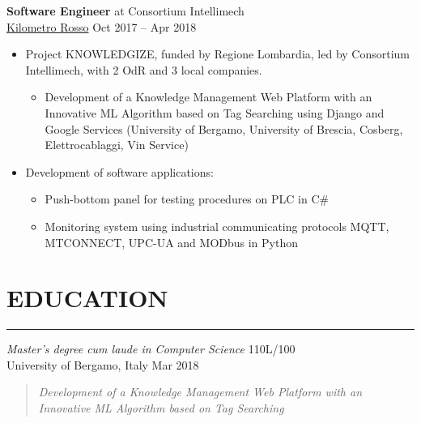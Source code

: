\documentclass[10pt]{article}
\newcommand{\cvsection}[1]{\section*{\centering\normalsize\uppercase{#1}}\vspace{-16pt}\rule{\linewidth}{0.2pt}}
\begin{document}
\vspace{6pt} %

\textbf{Software Engineer} at Consortium Intellimech\\
\href{https://www.linkedin.com/company/kilometro-rosso/}{Kilometro Rosso} \hfill Oct 2017 – Apr 2018
\begin{itemize}
  	\setlength\itemsep{-0.5em}
	\renewcommand\labelitemii{$\vcenter{\hbox{\tiny$\bullet$}}$}

	\item Project KNOWLEDGIZE, funded by Regione Lombardia, led by Consortium Intellimech, with 2 OdR and 3 local companies.
	\vspace{-6pt}
  	\begin{itemize}
  		\setlength\itemsep{-0.5em}
		\item Development of a Knowledge Management Web Platform with an Innovative ML Algorithm based on Tag Searching using Django and Google Services (University of Bergamo, University of Brescia, Cosberg, Elettrocablaggi, Vin Service)
	\end{itemize}

	
	\item Development of software applications:
	\vspace{-6pt}
  	\begin{itemize}
  		\setlength\itemsep{-0.5em}
		\item Push-bottom panel for testing procedures on PLC in C\#
		\item Monitoring system using industrial communicating protocols MQTT, MTCONNECT, UPC-UA and MODbus in Python
	\end{itemize}

\end{itemize}


\cvsection{education}

\textit{Master's degree cum laude in Computer Science} \hfill 110L\slash100\\
University of Bergamo, Italy \hfill Mar 2018
\vspace{-3pt}
\begin{quote}
	\textit{Development of a Knowledge Management Web Platform with an Innovative ML Algorithm based on Tag Searching}
\end{quote}
\end{document}
